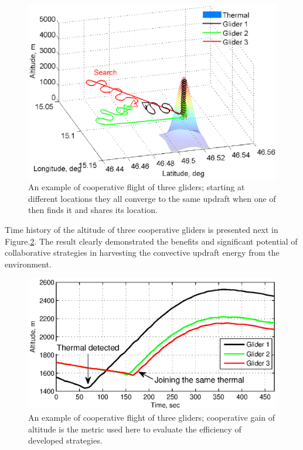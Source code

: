 \documentclass{ifacconf}
\begin{document}
\begin{figure}[thpb]
  \centering
  \includegraphics[scale=0.45]{Figures/paths_cooperative_flight.eps}
  \caption{An example of cooperative flight of three gliders; starting at different locations they all converge to the same updraft when one of then finds it and shares its location.}
  \label{fig:CoopFlightPaths}
\end{figure}
Time history of the altitude of three cooperative gliders is presented next in Figure.\ref{fig:CoopFlightHeight}. The result clearly demonstrated the benefits and significant potential of collaborative strategies in harvesting the convective updraft energy from the environment.

\begin{figure}[thpb]
  \centering
  \includegraphics[scale=0.6]{Figures/Coop_gain_altitude.eps}
  \caption{An example of cooperative flight of three gliders; cooperative gain of altitude is the metric used here to evaluate the efficiency of developed strategies.}
  \label{fig:CoopFlightHeight}
\end{figure}
\end{document}
